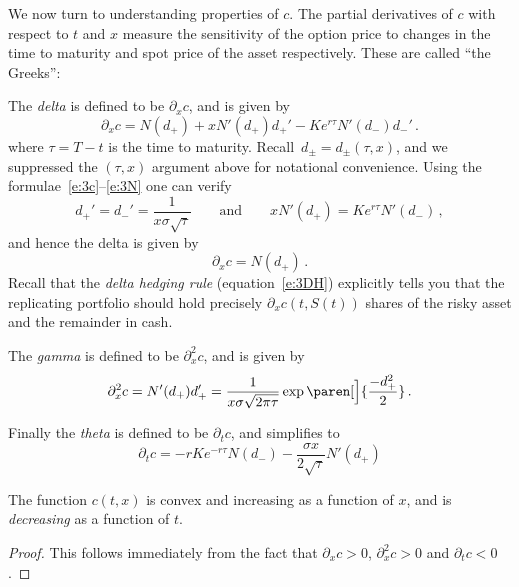 We now turn to understanding properties of $c$.
The partial derivatives of $c$ with respect to $t$ and $x$ measure the sensitivity of the option price to changes in the time to maturity and spot price of the asset respectively.
These are called ``the Greeks'':
\begin{asparaenum}
  \item
    The \emph{delta} is defined to be $\partial_x c$, and is given by
    \begin{equation*}
      \partial_x c = N(d_+) + x N'(d_+) d_+' - Ke^{r \tau} N'(d_-)d_-'\,.
    \end{equation*}
    where $\tau = T - t$ is the time to maturity.
    Recall~$d_\pm = d_\pm( \tau, x )$, and we suppressed the $(\tau, x)$ argument above for notational convenience.
    Using the formulae~\eqref{e:3c}--\eqref{e:3N} one can verify 
    \begin{equation*}
      d_+' = d_-' = \frac{1}{x \sigma \sqrt{\tau}}
      \qquad\text{and}\qquad
      x N'(d_+)  = Ke^{r \tau} N'(d_-)\,,
    \end{equation*}
    and hence the delta is given by
    \begin{equation*}
      \partial_x c = N(d_+)\,.
    \end{equation*}
    Recall that the \emph{delta hedging rule} (equation~\eqref{e:3DH}) explicitly tells you that the replicating portfolio should hold precisely $\partial_x c(t, S(t))$ shares of the risky asset and the remainder in cash.

  \item
    The \emph{gamma} is defined to be $\partial_x^2 c$, and is given by
    \begin{equation*}
      \partial_x^2 c
	= N'(d_+) d_+' 
	= \frac{1}{x \sigma \sqrt{2 \pi \tau}}
	  \exp\paren[\Big]{ \frac{-d_+^2}{2} } \,.
    \end{equation*}

  \item
    Finally the \emph{theta} is defined to be $\partial_t c$, and simplifies to
    \begin{equation*}
      \partial_t c = -r K e^{-r \tau} N(d_-)
	- \frac{\sigma x}{2 \sqrt{\tau}} N'(d_+)
    \end{equation*}
\end{asparaenum}

\begin{proposition}
  The function $c(t, x)$ is convex and increasing as a function of $x$, and is \emph{decreasing} as a function of $t$.
\end{proposition}
\begin{proof}
  This follows immediately from the fact that $\partial_x c > 0$, $\partial_x^2 c > 0$ and $\partial_t c < 0$.
\end{proof}

